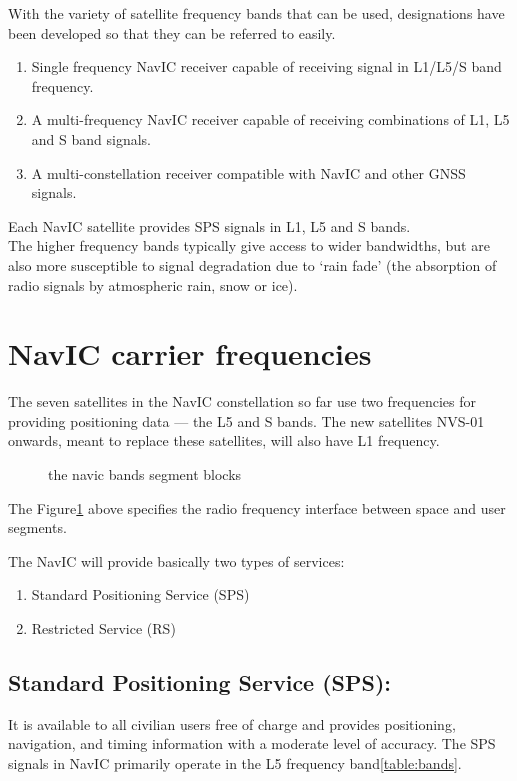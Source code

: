 With the variety of satellite frequency bands that can be used, designations have been developed so that they can be referred to easily. 
\begin{enumerate}
	\item Single frequency NavIC receiver capable of receiving signal in L1/L5/S band frequency.
	\item A multi-frequency NavIC receiver capable of receiving combinations of L1, L5 and S band signals.
	\item A multi-constellation receiver compatible with NavIC and other GNSS signals.
\end{enumerate}


Each NavIC satellite provides SPS signals in L1, L5 and S bands.
\\
The higher frequency bands typically give access to wider bandwidths, but are also more susceptible to signal degradation due to ‘rain fade’ (the absorption of radio signals by atmospheric rain, snow or ice).
\section{NavIC carrier frequencies}	
The seven satellites in the NavIC constellation so far use two frequencies for providing positioning data — the L5 and S bands. The new satellites NVS-01 onwards, meant to replace these satellites, will also have L1 frequency.


	\begin{figure}[h!]
	\centering
	
	\caption{the navic bands segment blocks}
	\label{figs:bandsfig}
	\end{figure}

The Figure\ref{figs:bandsfig} above specifies the radio frequency interface between space and user segments.

The NavIC will provide basically two types of services:
	\begin{enumerate}
	\item Standard Positioning Service (SPS)
	\item Restricted Service (RS)
	\end{enumerate}

		

\subsection{Standard Positioning Service (SPS):}
	It is available to all civilian users free of charge and provides positioning, navigation, and timing information with a moderate level of accuracy. The SPS signals in NavIC primarily operate in the L5 frequency band\ref{table:bands}.
